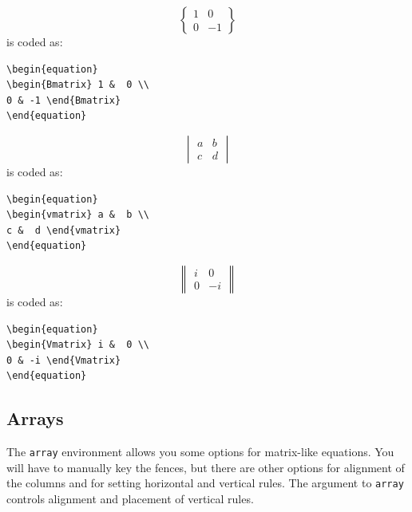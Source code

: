 \documentclass[lettersize,journal]{IEEEtran}
\begin{document}
\begin{equation}
\begin{Bmatrix} 1 &  0 \\ 
0 & -1 \end{Bmatrix}
\end{equation}
is coded as:
\begin{verbatim}
\begin{equation}
\begin{Bmatrix} 1 &  0 \\ 
0 & -1 \end{Bmatrix}
\end{equation}\end{verbatim}

\begin{equation}
\begin{vmatrix} a &  b \\ 
c &  d \end{vmatrix}
\end{equation}
is coded as:
\begin{verbatim}
\begin{equation}
\begin{vmatrix} a &  b \\ 
c &  d \end{vmatrix}
\end{equation}\end{verbatim}

\begin{equation}
\begin{Vmatrix} i &  0 \\ 
0 & -i \end{Vmatrix}
\end{equation}
is coded as:
\begin{verbatim}
\begin{equation}
\begin{Vmatrix} i &  0 \\ 
0 & -i \end{Vmatrix}
\end{equation}\end{verbatim}

\subsection{Arrays}
The {\tt{array}} environment allows you some options for matrix-like equations. You will have to manually key the fences, but there are other options for alignment of the columns and for setting horizontal and vertical rules. The argument to {\tt{array}} controls alignment and placement of vertical rules.
\end{document}
